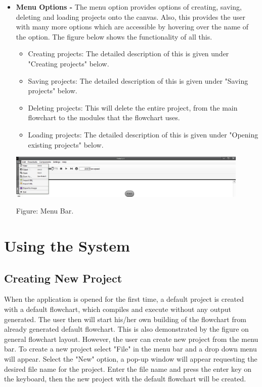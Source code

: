 \documentclass[11pt,a4paper,titlepage]{article}
\begin{document}
\begin{itemize}
						
			\item \textbf{Menu Options -} The menu option provides options of creating, saving, deleting and loading projects onto the canvas. Also, this provides the user with many more options which are accessible by hovering over the name of the option. The figure below shows the functionality of all this.\newline 
		
		\begin{itemize}
		\item Creating projects: The detailed description of this is given under "Creating projects"  below.
		\item Saving projects:  The detailed description of this is given under "Saving projects" below.
		\item Deleting projects: This will delete the entire project, from the main flowchart to the modules that the flowchart uses.
		\item Loading projects: The detailed description of this is given under "Opening existing projects" below.
\end{itemize}				
			
			
			\includegraphics[width=11.5cm]{images/Menu.jpg}
			\begin{center}
		Figure: Menu Bar.
		\end{center}
			
			
		\end{itemize}

	\newpage
	
	
	
	
	
	
\section{Using the System}
	\subsection{Creating New Project}
	
	When the application is opened for the first time, a default project is created with a default flowchart, which compiles and execute without any output generated. The user then will start his/her own building of the flowchart from already generated default flowchart. This is also demonstrated by the figure on general flowchart layout. \newline\newline
However, the user can create new project from the menu bar. To create a new project select "File" in the menu bar and a drop down menu will appear. Select the "New" option, a pop-up window will appear requesting the desired file name for the project. Enter the file name and press the enter key on the keyboard, then the new project with the default flowchart will be created. \newline
		
\end{document}
